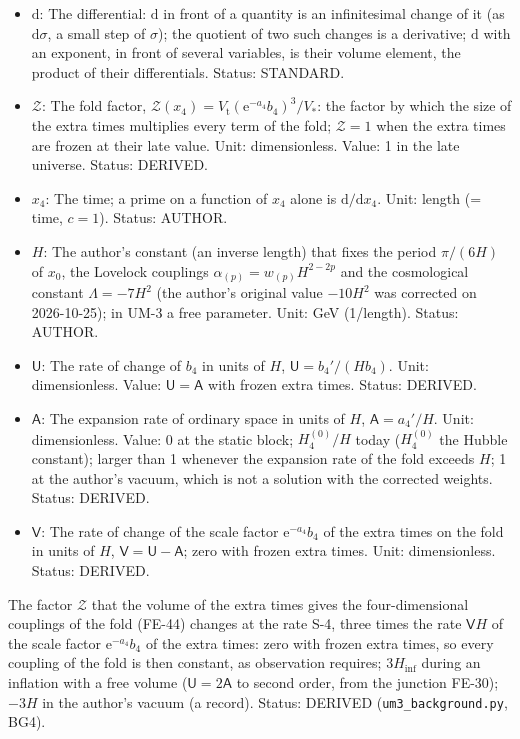 \documentclass[
  10pt,
]{article}
\providecommand{\tightlist}{%
  \setlength{\itemsep}{0pt}\setlength{\parskip}{0pt}}
\begin{document}
\begin{itemize}
\tightlist
\item
  \(\mathrm{d}\): The differential: \(\mathrm{d}\) in front of a
  quantity is an infinitesimal change of it (as \(\mathrm{d}\sigma\), a
  small step of \(\sigma\)); the quotient of two such changes is a
  derivative; \(\mathrm{d}\) with an exponent, in front of several
  variables, is their volume element, the product of their
  differentials. Status: STANDARD.
\item
  \(\mathcal{Z}\): The fold factor,
  \(\mathcal{Z}(x_4) = V_{\mathrm{t}}(\mathrm{e}^{-a_4}b_4)^3/V_*\): the
  factor by which the size of the extra times multiplies every term of
  the fold; \(\mathcal{Z} = 1\) when the extra times are frozen at their
  late value. Unit: dimensionless. Value: 1 in the late universe.
  Status: DERIVED.
\item
  \(x_4\): The time; a prime on a function of \(x_4\) alone is
  \(\mathrm{d}/\mathrm{d}x_4\). Unit: length (= time, \(c = 1\)).
  Status: AUTHOR.
\item
  \(H\): The author's constant (an inverse length) that fixes the period
  \(\pi/(6H)\) of \(x_0\), the Lovelock couplings
  \(\alpha_{(p)} = w_{(p)}H^{2-2p}\) and the cosmological constant
  \(\Lambda = -7H^2\) (the author's original value \(-10H^2\) was
  corrected on 2026-10-25); in UM-3 a free parameter. Unit: GeV
  (1/length). Status: AUTHOR.
\item
  \(\mathsf{U}\): The rate of change of \(b_4\) in units of \(H\),
  \(\mathsf{U} = b_4'/(Hb_4)\). Unit: dimensionless. Value:
  \(\mathsf{U} = \mathsf{A}\) with frozen extra times. Status: DERIVED.
\item
  \(\mathsf{A}\): The expansion rate of ordinary space in units of
  \(H\), \(\mathsf{A} = a_4'/H\). Unit: dimensionless. Value: 0 at the
  static block; \(H_4^{(0)}/H\) today (\(H_4^{(0)}\) the Hubble
  constant); larger than 1 whenever the expansion rate of the fold
  exceeds \(H\); 1 at the author's vacuum, which is not a solution with
  the corrected weights. Status: DERIVED.
\item
  \(\mathsf{V}\): The rate of change of the scale factor
  \(\mathrm{e}^{-a_4}b_4\) of the extra times on the fold in units of
  \(H\), \(\mathsf{V} = \mathsf{U} - \mathsf{A}\); zero with frozen
  extra times. Unit: dimensionless. Status: DERIVED.
\end{itemize}

The factor \(\mathcal{Z}\) that the volume of the extra times gives the
four-dimensional couplings of the fold (FE-44) changes at the rate S-4,
three times the rate \(\mathsf{V}H\) of the scale factor
\(\mathrm{e}^{-a_4}b_4\) of the extra times: zero with frozen extra
times, so every coupling of the fold is then constant, as observation
requires; \(3H_{\mathrm{inf}}\) during an inflation with a free volume
(\(\mathsf{U} = 2\mathsf{A}\) to second order, from the junction FE-30);
\(-3H\) in the author's vacuum (a record). Status: DERIVED
(\texttt{um3\_background.py}, BG4).
\end{document}
